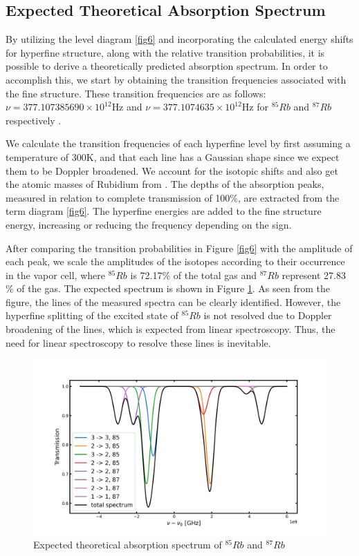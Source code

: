 \documentclass[12pt]{article}
\begin{document}
\subsection{Expected Theoretical Absorption Spectrum}

By utilizing the level diagram \ref{fig6} and incorporating the calculated energy shifts for hyperfine structure, along with the relative transition probabilities, it is possible to derive a theoretically predicted absorption spectrum. In order to accomplish this, we start by obtaining the transition frequencies associated with the fine structure. These transition frequencies are as follows: $\nu = 377.107 385 690 \times 10^{12}$Hz and $\nu = 377.107 463 5 \times 10^{12}$Hz for $^{85}Rb$ and $^{87}Rb$ respectively \cite{Rb85}\cite{Rb87}.

We calculate the transition frequencies of each hyperfine level by first assuming a temperature of 300K, and that each line has a Gaussian shape since we expect them to be Doppler broadened. We account for the isotopic shifts and also get the atomic masses of Rubidium from \cite{Rb85}\cite{Rb87}. The depths of the absorption peaks, measured in relation to complete transmission of 100\%, are extracted from the term diagram \ref{fig6}. The hyperfine energies are added to the fine structure energy, increasing or reducing the frequency depending on the sign. 

After comparing the transition probabilities in Figure \ref{fig6} with the amplitude of each peak, we scale the amplitudes of the isotopes according to their occurrence in the vapor cell, where $^{85}Rb$ is 72.17\% of the total gas and $^{87}Rb$ represent 27.83 \% of the gas. 
The expected spectrum is shown in Figure \ref{fig7}. As seen from the figure, the lines of the measured spectra can be clearly identified. However, the hyperfine splitting of the excited state of $^{85}Rb$ is not resolved due to Doppler broadening of the lines, which is expected from linear spectroscopy. Thus, the need for linear spectroscopy to resolve these lines is inevitable. 

\begin{figure}[H]
    \centering
    \includegraphics[width = \textwidth]{fig/Theoretical_spectrum.png}
    \caption{Expected theoretical absorption spectrum of $^{85}Rb$ and $^{87}Rb$}
    \label{fig7}
\end{figure}
\end{document}
